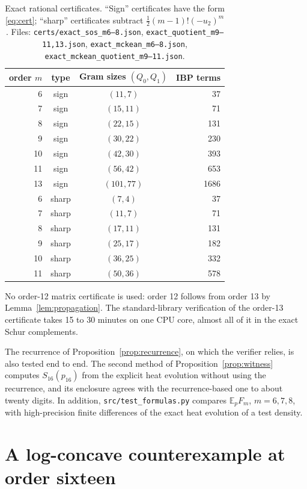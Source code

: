 \documentclass[11pt]{article}
\theoremstyle{definition}
\theoremstyle{remark}
\newcommand{\E}{\mathbb E}
\begin{document}
\begin{table}[htbp]
\centering
\begin{tabular}{rccr}
\toprule
order $m$ & type & Gram sizes $(Q_0,Q_1)$ & IBP terms \\
\midrule
6 & sign & $(11,7)$ & 37\\
7 & sign & $(15,11)$ & 71\\
8 & sign & $(22,15)$ & 131\\
9 & sign & $(30,22)$ & 230\\
10 & sign & $(42,30)$ & 393\\
11 & sign & $(56,42)$ & 653\\
13 & sign & $(101,77)$ & 1686\\
\midrule
6 & sharp & $(7,4)$ & 37\\
7 & sharp & $(11,7)$ & 71\\
8 & sharp & $(17,11)$ & 131\\
9 & sharp & $(25,17)$ & 182\\
10 & sharp & $(36,25)$ & 332\\
11 & sharp & $(50,36)$ & 578\\
\bottomrule
\end{tabular}
\caption{Exact rational certificates. ``Sign'' certificates have the form
\eqref{eq:cert}; ``sharp'' certificates subtract $\tfrac12(m-1)!(-u_2)^m$.
Files: \texttt{certs/exact\_sos\_m6--8.json}, \texttt{exact\_quotient\_m9--11,13.json},
\texttt{exact\_mckean\_m6--8.json}, \texttt{exact\_mckean\_quotient\_m9--11.json}.}
\label{tab:certs}
\end{table}

No order-12 matrix certificate is used: order 12 follows from order 13 by
Lemma~\ref{lem:propagation}. The standard-library verification of the order-13
certificate takes 15 to 30 minutes on one CPU core, almost all of it in the exact
Schur complements.

The recurrence of Proposition~\ref{prop:recurrence}, on which the verifier relies, is
also tested end to end. The second method of Proposition~\ref{prop:witness} computes
$S_{16}(p_{16})$ from the explicit heat evolution without using the recurrence, and its
enclosure agrees with the recurrence-based one to about twenty digits. In addition,
\texttt{src/test\_formulas.py} compares $\E_pF_m$, $m=6,7,8$, with high-precision
finite differences of the exact heat evolution of a test density.

\section{A log-concave counterexample at order sixteen}\label{sec:witness}
\end{document}
